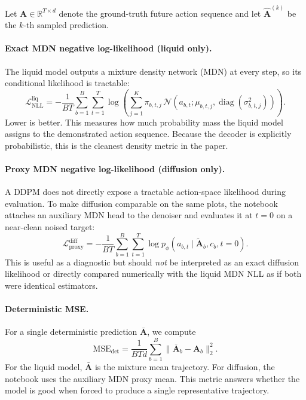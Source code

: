 \documentclass{article}
\begin{document}
Let $\mathbf{A}\in\mathbb{R}^{T\times d}$ denote the ground-truth future action sequence and let $\hat{\mathbf{A}}^{(k)}$ be the $k$-th sampled prediction.

\paragraph{Exact MDN negative log-likelihood (liquid only).}
The liquid model outputs a mixture density network (MDN) at every step, so its conditional likelihood is tractable:
\begin{equation}
\mathcal{L}_{\mathrm{NLL}}^{\mathrm{liq}} = -\frac{1}{BT}\sum_{b=1}^{B}\sum_{t=1}^{T}
\log\!\left(\sum_{j=1}^{K}\pi_{b,t,j}\,\mathcal{N}\!\left(a_{b,t};\mu_{b,t,j},\operatorname{diag}(\sigma^2_{b,t,j})\right)\right).
\end{equation}
Lower is better. This measures how much probability mass the liquid model assigns to the demonstrated action sequence. Because the decoder is explicitly probabilistic, this is the cleanest density metric in the paper.

\paragraph{Proxy MDN negative log-likelihood (diffusion only).}
A DDPM does not directly expose a tractable action-space likelihood during evaluation. To make diffusion comparable on the same plots, the notebook attaches an auxiliary MDN head to the denoiser and evaluates it at $t=0$ on a near-clean noised target:
\begin{equation}
\mathcal{L}_{\mathrm{proxy}}^{\mathrm{diff}} = -\frac{1}{BT}\sum_{b=1}^{B}\sum_{t=1}^{T} \log p_{\phi}(a_{b,t}\mid \tilde{\mathbf{A}}_{b}, c_b, t{=}0).
\end{equation}
This is useful as a diagnostic but should \emph{not} be interpreted as an exact diffusion likelihood or directly compared numerically with the liquid MDN NLL as if both were identical estimators.

\paragraph{Deterministic MSE.}
For a single deterministic prediction $\bar{\mathbf{A}}$, we compute
\begin{equation}
\mathrm{MSE}_{\mathrm{det}} = \frac{1}{BTd}\sum_{b=1}^{B}\lVert \bar{\mathbf{A}}_b - \mathbf{A}_b \rVert_2^2.
\end{equation}
For the liquid model, $\bar{\mathbf{A}}$ is the mixture mean trajectory. For diffusion, the notebook uses the auxiliary MDN proxy mean. This metric answers whether the model is good when forced to produce a single representative trajectory.
\end{document}
